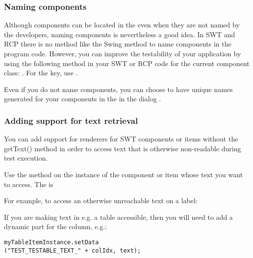 
\subsubsection{Naming components}
Although  components  can be located in the \gdaut{} even when they are not named by the developers, naming components is nevertheless a good idea. In SWT and RCP there is no method like the Swing  method to name components in the program code. However, you can improve the testability of your application by using the following method in your SWT or RCP code for the current component class: . For the key, use . 

Even if you do not name components, you can choose to have unique names generated for your components in the \gdaut{} in the \gdaut{} dialog . 

\subsubsection{Adding support for text retrieval}

You can add support for renderers for SWT components or items  without the getText() method in order to access text that is otherwise non-readable during test execution. 

Use the method  on the instance of the component or item whose text you want to access. The  is 

For example, to access an otherwise unreachable text on a label:\\

If you are making text in e.g. a table accessible, then you will need to add a dynamic part for the column, e.g.:\\
\begin{verbatim}
myTableItemInstance.setData
("TEST_TESTABLE_TEXT_" + colIdx, text);
\end{verbatim}
